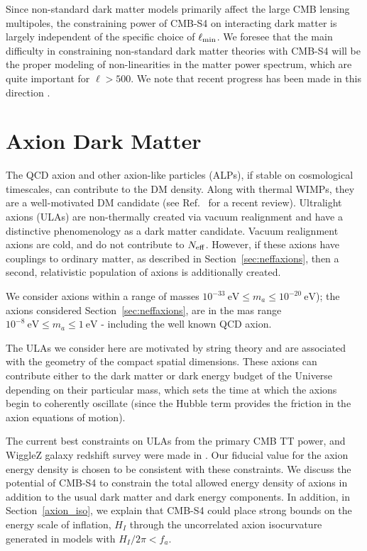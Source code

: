%

Since non-standard dark matter models primarily affect the large CMB lensing multipoles, the constraining power of CMB-S4 on interacting dark matter is largely independent of the specific choice of $\ell_{\rm min}$. We foresee that the main difficulty in constraining non-standard dark matter theories with CMB-S4 will be the proper modeling of non-linearities in the matter power spectrum, which are quite important for $\ell > 500$. We note that recent progress has been made in this direction \cite{Vogelsberger:2015gpr}.


\section{Axion Dark Matter}
The QCD axion and other axion-like particles (ALPs), if stable on cosmological timescales, can contribute to the DM density. Along with thermal WIMPs, they are a well-motivated DM candidate (see Ref.~\cite{Marsh:2015xka} for a recent review). Ultralight axions (ULAs) are non-thermally created via vacuum realignment and have a distinctive phenomenology as a dark matter candidate. 
Vacuum realignment axions are cold, and do not contribute to $N_{\rm eff}$. However, if these axions have couplings to ordinary matter, as described in Section~\ref{sec:neffaxions}, then a second, relativistic population of axions is additionally created.

We consider axions within a range of masses $10^{-33}~\mathrm{eV}\leq m_{a}\leq 10^{-20}~\mathrm{eV}$); the axions considered Section~\ref{sec:neffaxions}, are in the mas range $10^{-8}~\mathrm{eV}\leq m_{a}\leq 1~\mathrm{eV}$ - including the well known QCD axion.

The ULAs we consider here are motivated by string theory and are associated with the geometry of the compact spatial dimensions. These axions can contribute either to the dark matter or dark energy budget of the Universe depending on their particular mass, which sets the time at which the axions begin to coherently oscillate (since the Hubble term provides the friction in the axion equations of motion).

The current best constraints on ULAs from the primary CMB TT power, and WiggleZ galaxy redshift survey were made in \cite{Hlozek:2014lca}. Our fiducial value for the axion energy density is chosen to be consistent with these constraints. We discuss the potential of CMB-S4 to constrain the total allowed energy density of axions in addition to the usual dark matter and dark energy components. In addition, in Section~\ref{axion_iso}, we explain that CMB-S4 could place strong bounds on the energy scale of inflation, $H_I$ through the uncorrelated axion isocurvature generated in models with $H_I/2\pi<f_a.$

